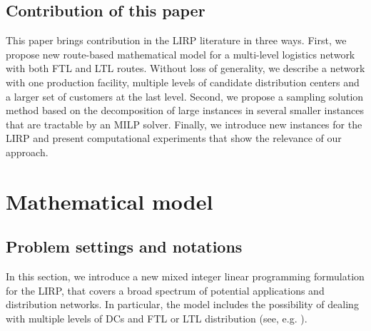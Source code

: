 \documentclass[a4paper,10pt]{article}
\begin{document}
\begin{linenumbers}
\subsection{Contribution of this paper}

This paper brings contribution in the LIRP literature in three ways. 
First, we propose new route-based mathematical model for a multi-level logistics network with both FTL and LTL routes. 
Without loss of generality, we describe a network with one production facility, multiple levels of candidate distribution centers and a larger set of customers at the last level. 
Second, we propose a sampling solution method based on the decomposition of large instances in several smaller instances that are tractable by an MILP solver. 
Finally, we introduce new instances for the LIRP and present computational experiments that show the relevance of our approach. 



\section{Mathematical model}

\label{sec:model}

\subsection{Problem settings and notations}\label{subsection:settings}


In this section, we introduce a new mixed integer linear programming formulation for the LIRP, 
that covers a broad spectrum of potential applications and distribution networks. 
In particular, the model includes the possibility of dealing with multiple levels of DCs and FTL or LTL distribution (see, e.g. \cite{AmbScu05}). 


\end{linenumbers}
\end{document}
